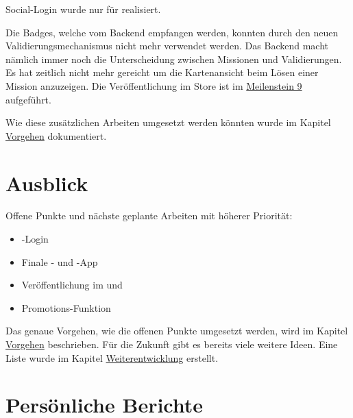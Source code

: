 Social-Login wurde nur für  realisiert.

Die Badges, welche vom \gls{Backend} empfangen werden, konnten durch den neuen Validierungsmechanismus nicht mehr verwendet werden.
Das Backend macht nämlich immer noch die Unterscheidung zwischen Missionen und Validierungen.
Es hat zeitlich nicht mehr gereicht um die Kartenansicht beim Lösen einer Mission anzuzeigen.
Die Veröffentlichung im  Store ist im \hyperref[pm-ms9]{Meilenstein 9} aufgeführt.

Wie diese zusätzlichen Arbeiten umgesetzt werden könnten wurde im Kapitel \hyperref[pd-weiterentwicklung-vorgehen]{Vorgehen} dokumentiert.

\section{Ausblick}
Offene Punkte und nächste geplante Arbeiten mit höherer Priorität:

\begin{itemize}
	\item {}-Login
	\item Finale - und -App
	\item Veröffentlichung im  und  
	\item Promotions-Funktion
\end{itemize}

Das genaue Vorgehen, wie die offenen Punkte umgesetzt werden, wird im Kapitel \hyperref[pd-weiterentwicklung-vorgehen]{Vorgehen} beschrieben.
Für die Zukunft gibt es bereits viele weitere Ideen. 
Eine Liste wurde im Kapitel \hyperref[pd-weiterentwicklung-realistisch]{Weiterentwicklung} erstellt. 


\newpage
\section{Persönliche Berichte}
